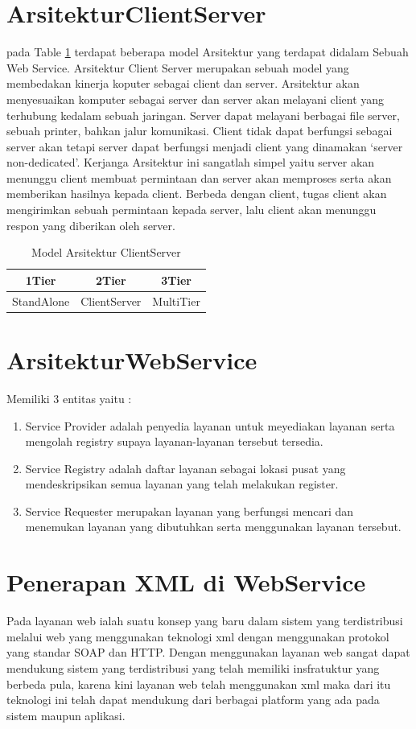 
\section{ArsitekturClientServer}
pada Table \ref{table} terdapat beberapa model Arsitektur yang terdapat didalam Sebuah Web Service. 
Arsitektur Client Server merupakan  sebuah model yang membedakan kinerja koputer sebagai client dan server. 
Arsitektur akan menyesuaikan komputer sebagai server dan server akan melayani client yang terhubung kedalam sebuah jaringan.
Server dapat melayani berbagai file server, sebuah printer, bahkan jalur komunikasi.
Client tidak dapat berfungsi sebagai server akan tetapi server dapat berfungsi menjadi client yang dinamakan `server non-dedicated'.
Kerjanga Arsitektur ini sangatlah simpel yaitu server akan menunggu client membuat permintaan dan server akan memproses serta
akan memberikan hasilnya kepada client. Berbeda dengan client, tugas client akan mengirimkan sebuah permintaan kepada server, lalu
client akan menunggu respon yang diberikan oleh server.

\begin{table}[ht]
\caption{Model Arsitektur Client\-Server}
\centering
\begin{tabular}{ccc}
\hline
1\-Tier&2\-Tier&3\-Tier\\
\hline
Stand\-Alone&Client\-Server&Multi\-Tier\\
\hline
\end{tabular}
\label{table}
\end{table}

\section{ArsitekturWebService}
Memiliki 3 entitas yaitu :
\begin{enumerate}
\item Service Provider adalah penyedia layanan untuk meyediakan layanan serta mengolah registry supaya layanan-layanan tersebut tersedia.
\item Service Registry adalah daftar layanan sebagai lokasi pusat yang mendeskripsikan semua layanan yang telah melakukan register.
\item Service Requester merupakan layanan yang berfungsi mencari dan menemukan layanan yang dibutuhkan serta menggunakan layanan tersebut.
\end{enumerate}

\section{Penerapan XML di WebService}
Pada layanan web ialah suatu konsep yang baru dalam sistem yang terdistribusi melalui web yang menggunakan teknologi xml dengan 
menggunakan protokol yang standar SOAP dan HTTP. Dengan menggunakan layanan web sangat dapat mendukung sistem yang terdistribusi 
yang telah memiliki insfratuktur yang berbeda pula, karena kini layanan web telah menggunakan xml maka dari itu teknologi ini telah dapat 
mendukung dari berbagai platform yang ada pada sistem maupun aplikasi.

